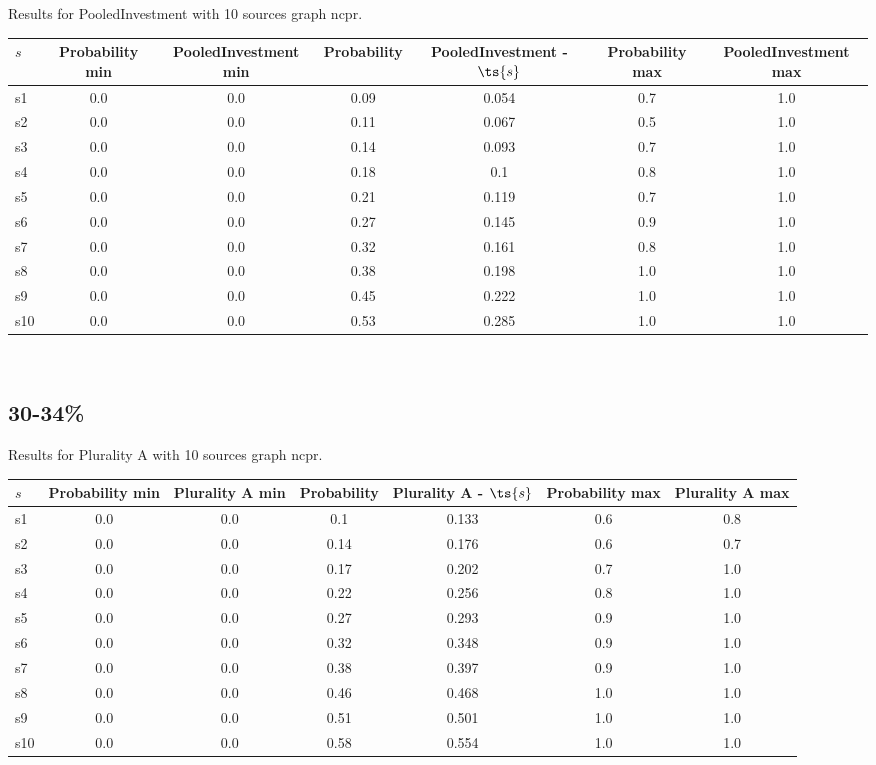\documentclass{article}
\begin{document}
\noindent Results for PooledInvestment with 10 sources graph ncpr.

\noindent\begin{tabular}{|l|c|c|c|c|c|c|}
\hline
$s$& Probability min & PooledInvestment min & Probability & PooledInvestment - $\ts{s}$ & Probability max & PooledInvestment max\\
\hline
s1 &0.0 & 0.0 & 0.09 & 0.054 & 0.7 & 1.0\\
\hline
s2 &0.0 & 0.0 & 0.11 & 0.067 & 0.5 & 1.0\\
\hline
s3 &0.0 & 0.0 & 0.14 & 0.093 & 0.7 & 1.0\\
\hline
s4 &0.0 & 0.0 & 0.18 & 0.1 & 0.8 & 1.0\\
\hline
s5 &0.0 & 0.0 & 0.21 & 0.119 & 0.7 & 1.0\\
\hline
s6 &0.0 & 0.0 & 0.27 & 0.145 & 0.9 & 1.0\\
\hline
s7 &0.0 & 0.0 & 0.32 & 0.161 & 0.8 & 1.0\\
\hline
s8 &0.0 & 0.0 & 0.38 & 0.198 & 1.0 & 1.0\\
\hline
s9 &0.0 & 0.0 & 0.45 & 0.222 & 1.0 & 1.0\\
\hline
s10 &0.0 & 0.0 & 0.53 & 0.285 & 1.0 & 1.0\\
\hline
\end{tabular}\\

\newpage

\subsection{30-34\%}

\noindent Results for Plurality A with 10 sources graph ncpr.

\noindent\begin{tabular}{|l|c|c|c|c|c|c|}
\hline
$s$& Probability min & Plurality A min & Probability & Plurality A - $\ts{s}$ & Probability max & Plurality A max\\
\hline
s1 &0.0 & 0.0 & 0.1 & 0.133 & 0.6 & 0.8\\
\hline
s2 &0.0 & 0.0 & 0.14 & 0.176 & 0.6 & 0.7\\
\hline
s3 &0.0 & 0.0 & 0.17 & 0.202 & 0.7 & 1.0\\
\hline
s4 &0.0 & 0.0 & 0.22 & 0.256 & 0.8 & 1.0\\
\hline
s5 &0.0 & 0.0 & 0.27 & 0.293 & 0.9 & 1.0\\
\hline
s6 &0.0 & 0.0 & 0.32 & 0.348 & 0.9 & 1.0\\
\hline
s7 &0.0 & 0.0 & 0.38 & 0.397 & 0.9 & 1.0\\
\hline
s8 &0.0 & 0.0 & 0.46 & 0.468 & 1.0 & 1.0\\
\hline
s9 &0.0 & 0.0 & 0.51 & 0.501 & 1.0 & 1.0\\
\hline
s10 &0.0 & 0.0 & 0.58 & 0.554 & 1.0 & 1.0\\
\hline
\end{tabular}\\
\end{document}
